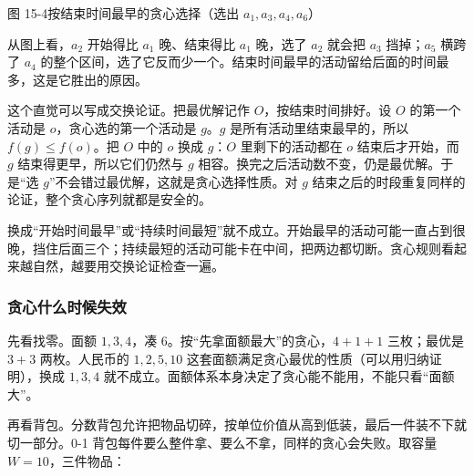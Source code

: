 \begin{center}
\par\smallskip
{\small\color{MutedText} 图 15-4\quad 按结束时间最早的贪心选择（选出 $a_1,a_3,a_4,a_6$）}
\end{center}

从图上看，$a_2$ 开始得比 $a_1$ 晚、结束得比 $a_1$ 晚，选了 $a_2$ 就会把 $a_3$ 挡掉；$a_5$ 横跨了 $a_4$ 的整个区间，选了它反而少一个。结束时间最早的活动留给后面的时间最多，这是它胜出的原因。

这个直觉可以写成交换论证。把最优解记作 $O$，按结束时间排好。设 $O$ 的第一个活动是 $o$，贪心选的第一个活动是 $g$。$g$ 是所有活动里结束最早的，所以 $f(g)\le f(o)$。把 $O$ 中的 $o$ 换成 $g$：$O$ 里剩下的活动都在 $o$ 结束后才开始，而 $g$ 结束得更早，所以它们仍然与 $g$ 相容。换完之后活动数不变，仍是最优解。于是“选 $g$”不会错过最优解，这就是贪心选择性质。对 $g$ 结束之后的时段重复同样的论证，整个贪心序列就都是安全的。

换成“开始时间最早”或“持续时间最短”就不成立。开始最早的活动可能一直占到很晚，挡住后面三个；持续最短的活动可能卡在中间，把两边都切断。贪心规则看起来越自然，越要用交换论证检查一遍。

\subsubsection{贪心什么时候失效}

先看找零。面额 $1,3,4$，凑 $6$。按“先拿面额最大”的贪心，$4+1+1$ 三枚；最优是 $3+3$ 两枚。人民币的 $1,2,5,10$ 这套面额满足贪心最优的性质（可以用归纳证明），换成 $1,3,4$ 就不成立。面额体系本身决定了贪心能不能用，不能只看“面额大”。

再看背包。分数背包允许把物品切碎，按单位价值从高到低装，最后一件装不下就切一部分。0-1 背包每件要么整件拿、要么不拿，同样的贪心会失败。取容量 $W=10$，三件物品：

